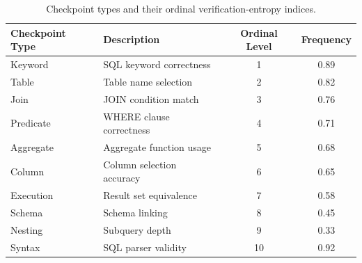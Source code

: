 \begin{table}[ht]
\centering
\begin{tabular}{llcc}
\toprule
Checkpoint Type & Description & Ordinal Level & Frequency \\
\midrule
Keyword & SQL keyword correctness & 1 & 0.89 \\
Table & Table name selection & 2 & 0.82 \\
Join & JOIN condition match & 3 & 0.76 \\
Predicate & WHERE clause correctness & 4 & 0.71 \\
Aggregate & Aggregate function usage & 5 & 0.68 \\
Column & Column selection accuracy & 6 & 0.65 \\
Execution & Result set equivalence & 7 & 0.58 \\
Schema & Schema linking & 8 & 0.45 \\
Nesting & Subquery depth & 9 & 0.33 \\
Syntax & SQL parser validity & 10 & 0.92 \\
\bottomrule
\end{tabular}
\caption{Checkpoint types and their ordinal verification-entropy indices.}
\label{tab:checkpoints}
\end{table}

